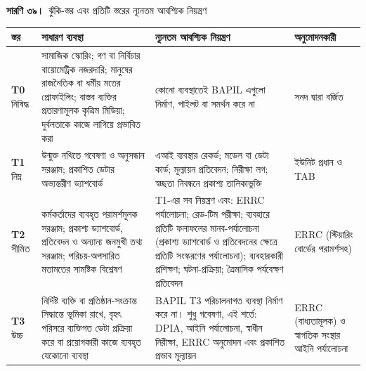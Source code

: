 \documentclass[border=10pt]{standalone}
\begin{document}
\begin{minipage}{17cm}
{\large\bfseries সারণি ৩৯।}\ {\large ঝুঁকি-স্তর এবং প্রতিটি স্তরের ন্যূনতম আবশ্যিক নিয়ন্ত্রণ}\par\vspace{7pt}
\small
{}
\begin{tabularx}{\linewidth}{@{}>{\hsize=0.667\hsize\raggedright\arraybackslash}X>{\hsize=1.067\hsize\raggedright\arraybackslash}X>{\hsize=1.600\hsize\raggedright\arraybackslash}X>{\hsize=0.667\hsize\raggedright\arraybackslash}X@{}}
\arrayrulecolor{bapilrule}\toprule
\rowcolor{white}\textbf{স্তর} & \textbf{সাধারণ ব্যবস্থা} & \textbf{ন্যূনতম আবশ্যিক নিয়ন্ত্রণ} & \textbf{অনুমোদনকারী} \\
\midrule
\textbf{T0} নিষিদ্ধ & সামাজিক স্কোরিং; গণ বা নির্বিচার বায়োমেট্রিক নজরদারি; মানুষের রাজনৈতিক বা ধর্মীয় মতের প্রোফাইলিং; বাস্তব ব্যক্তির প্রতারণামূলক কৃত্রিম মিডিয়া; দুর্বলতাকে কাজে লাগিয়ে প্রভাবিত করা & কোনো ব্যবস্থাতেই BAPIL এগুলো নির্মাণ, পাইলট বা সমর্থন করে না & সনদ দ্বারা বর্জিত \\
\textbf{T1} নিম্ন & উন্মুক্ত নথিতে গবেষণা ও অনুসন্ধান সরঞ্জাম; প্রকাশিত ডেটার অভ্যন্তরীণ ড্যাশবোর্ড & এআই ব্যবস্থার রেকর্ড; মডেল বা ডেটা কার্ড; মূল্যায়ন প্রতিবেদন; নিরীক্ষা লগ; স্বচ্ছতা নিবন্ধনে প্রকাশ্য তালিকাভুক্তি & ইউনিট প্রধান ও TAB \\
\textbf{T2} সীমিত & কর্মকর্তাদের ব্যবহৃত পরামর্শমূলক সরঞ্জাম; প্রকাশ্য ড্যাশবোর্ড, প্রতিবেদন ও অন্যান্য জনমুখী তথ্য সরঞ্জাম; পরিচয়-অপসারিত মতামতের সামষ্টিক বিশ্লেষণ & T1-এর সব নিয়ন্ত্রণ এবং: ERRC পর্যালোচনা; রেড-টিম পরীক্ষা; ব্যবহারে প্রতিটি ফলাফলের মানব-পর্যালোচনা (প্রকাশ্য ড্যাশবোর্ড ও প্রতিবেদনের ক্ষেত্রে প্রতিটি সংস্করণের পর্যালোচনা); ব্যবহারকারী প্রশিক্ষণ; ঘটনা-প্রক্রিয়া; ত্রৈমাসিক পর্যবেক্ষণ প্রতিবেদন & ERRC (স্টিয়ারিং বোর্ডের পরামর্শসহ) \\
\textbf{T3} উচ্চ & নির্দিষ্ট ব্যক্তি বা প্রতিষ্ঠান-সংক্রান্ত সিদ্ধান্তে ভূমিকা রাখে, বৃহৎ পরিসরে ব্যক্তিগত ডেটা প্রক্রিয়া করে বা প্রয়োগকারী কাজে ব্যবহৃত যেকোনো ব্যবস্থা & BAPIL T3 পরিচালনাগত ব্যবস্থা নির্মাণ করে না। শুধু গবেষণা, এই শর্তে: DPIA, আইনি পর্যালোচনা, স্বাধীন নিরীক্ষা, ERRC অনুমোদন এবং প্রকাশিত প্রভাব মূল্যায়ন & ERRC (বাধ্যতামূলক) ও স্বাগতিক সংস্থার আইনি পর্যালোচনা \\
\bottomrule
\end{tabularx}
\par{}
\end{minipage}
\end{document}
